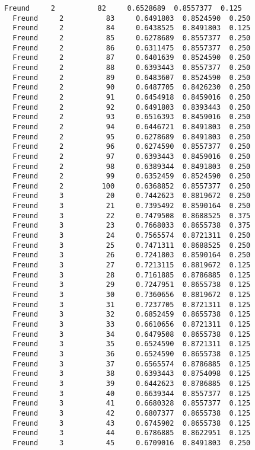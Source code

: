 \documentclass[11pt]{article}
\begin{document}
\begin{Verbatim}[commandchars=\\\{\}]
  Freund     2          82     0.6528689  0.8557377  0.125
  Freund     2          83     0.6491803  0.8524590  0.250
  Freund     2          84     0.6438525  0.8491803  0.125
  Freund     2          85     0.6278689  0.8557377  0.250
  Freund     2          86     0.6311475  0.8557377  0.250
  Freund     2          87     0.6401639  0.8524590  0.250
  Freund     2          88     0.6393443  0.8557377  0.250
  Freund     2          89     0.6483607  0.8524590  0.250
  Freund     2          90     0.6487705  0.8426230  0.250
  Freund     2          91     0.6454918  0.8459016  0.250
  Freund     2          92     0.6491803  0.8393443  0.250
  Freund     2          93     0.6516393  0.8459016  0.250
  Freund     2          94     0.6446721  0.8491803  0.250
  Freund     2          95     0.6278689  0.8491803  0.250
  Freund     2          96     0.6274590  0.8557377  0.250
  Freund     2          97     0.6393443  0.8459016  0.250
  Freund     2          98     0.6389344  0.8491803  0.250
  Freund     2          99     0.6352459  0.8524590  0.250
  Freund     2         100     0.6368852  0.8557377  0.250
  Freund     3          20     0.7442623  0.8819672  0.250
  Freund     3          21     0.7395492  0.8590164  0.250
  Freund     3          22     0.7479508  0.8688525  0.375
  Freund     3          23     0.7668033  0.8655738  0.375
  Freund     3          24     0.7565574  0.8721311  0.250
  Freund     3          25     0.7471311  0.8688525  0.250
  Freund     3          26     0.7241803  0.8590164  0.250
  Freund     3          27     0.7213115  0.8819672  0.125
  Freund     3          28     0.7161885  0.8786885  0.125
  Freund     3          29     0.7247951  0.8655738  0.125
  Freund     3          30     0.7360656  0.8819672  0.125
  Freund     3          31     0.7237705  0.8721311  0.125
  Freund     3          32     0.6852459  0.8655738  0.125
  Freund     3          33     0.6610656  0.8721311  0.125
  Freund     3          34     0.6479508  0.8655738  0.125
  Freund     3          35     0.6524590  0.8721311  0.125
  Freund     3          36     0.6524590  0.8655738  0.125
  Freund     3          37     0.6565574  0.8786885  0.125
  Freund     3          38     0.6393443  0.8754098  0.125
  Freund     3          39     0.6442623  0.8786885  0.125
  Freund     3          40     0.6639344  0.8557377  0.125
  Freund     3          41     0.6680328  0.8557377  0.125
  Freund     3          42     0.6807377  0.8655738  0.125
  Freund     3          43     0.6745902  0.8655738  0.125
  Freund     3          44     0.6786885  0.8622951  0.125
  Freund     3          45     0.6709016  0.8491803  0.250

\end{Verbatim}
\end{document}
